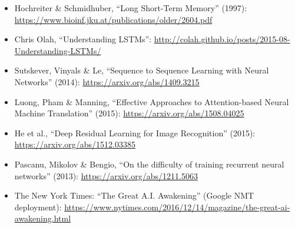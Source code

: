 \documentclass[a4paper]{article}
\begin{document}
\begin{itemize}
    \item Hochreiter \& Schmidhuber, ``Long Short-Term Memory'' (1997): \url{https://www.bioinf.jku.at/publications/older/2604.pdf}
    \item Chris Olah, ``Understanding LSTMs'': \url{http://colah.github.io/posts/2015-08-Understanding-LSTMs/}
    \item Sutskever, Vinyals \& Le, ``Sequence to Sequence Learning with Neural Networks'' (2014): \url{https://arxiv.org/abs/1409.3215}
    \item Luong, Pham \& Manning, ``Effective Approaches to Attention-based Neural Machine Translation'' (2015): \url{https://arxiv.org/abs/1508.04025}
    \item He et al., ``Deep Residual Learning for Image Recognition'' (2015): \url{https://arxiv.org/abs/1512.03385}
    \item Pascanu, Mikolov \& Bengio, ``On the difficulty of training recurrent neural networks'' (2013): \url{https://arxiv.org/abs/1211.5063}
    \item The New York Times: ``The Great A.I. Awakening'' (Google NMT deployment): \url{https://www.nytimes.com/2016/12/14/magazine/the-great-ai-awakening.html}
\end{itemize}
\end{document}
